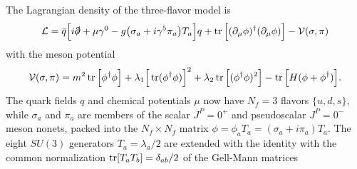 The Lagrangian density of the three-flavor model is \cite{ref:lsm3f,ref:lsm3f_details}
\begin{equation}
	\mathcal{L} = \bar{q} \Big[ i \slashed\partial + \mu \gamma^0 - g \big(\sigma_a + i \gamma^5 \pi_a\big) T_a \Big] q + \operatorname{tr}\Big[(\partial_\mu \phi)^\dagger (\partial_\mu \phi)\Big] - \mathcal{V}(\sigma, \pi)
\label{eq:lsm:lagrangian3f}
\end{equation}
with the meson potential
\begin{equation}
	\mathcal{V}(\sigma, \pi) = m^2 \operatorname{tr}\Big[\phi^\dagger \phi\Big] + \lambda_1 \Big[\operatorname{tr}(\phi^\dagger \phi)\Big]^2 + \lambda_2 \operatorname{tr}\Big[(\phi^\dagger \phi)^2\Big] - \operatorname{tr}\Big[H(\phi+\phi^\dagger)\Big].
\label{eq:lsm:potential3f}
\end{equation}
The quark fields $q$ and chemical potentials $\mu$ now have $N_f=3$ flavors $\{u,d,s\}$,
while $\sigma_a$ and $\pi_a$ are members of the scalar $J^P=0^+$ and pseudoscalar $J^P=0^-$ meson nonets,
packed into the $N_f \times N_f$ matrix $\phi = \phi_a T_a = (\sigma_a + i \pi_a) T_a$.
The eight $SU(3)$ generators $T_a = \lambda_a/2$ are extended with the identity with the common normalization $\operatorname{tr}[T_a T_b] = \delta_{ab}/2$ of the Gell-Mann matrices
